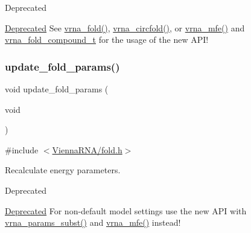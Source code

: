 \begin{DoxyRefDesc}{Deprecated}
\item[\hyperlink{deprecated__deprecated000069}{Deprecated}]See \hyperlink{group__mfe__global_ga29a33b2895f4e67b0480271ff289afdc}{vrna\+\_\+fold()}, \hyperlink{group__mfe__global_gaf973483d8acbc8cc9aacfc8a9b7f0074}{vrna\+\_\+circfold()}, or \hyperlink{group__mfe__global_gabd3b147371ccf25c577f88bbbaf159fd}{vrna\+\_\+mfe()} and \hyperlink{group__fold__compound_ga1b0cef17fd40466cef5968eaeeff6166}{vrna\+\_\+fold\+\_\+compound\+\_\+t} for the usage of the new A\+P\+I!\end{DoxyRefDesc}
\mbox{\label{group__mfe__global__deprecated_ga41bf8f6fa15b94471f7095cad9f0ccf3}} 
\subsubsection{\texorpdfstring{update\+\_\+fold\+\_\+params()}{update\_fold\_params()}}
{\footnotesize\ttfamily void update\+\_\+fold\+\_\+params (\begin{DoxyParamCaption}\item[{void}]{ }\end{DoxyParamCaption})}



{\ttfamily \#include $<$\hyperlink{fold_8h}{Vienna\+R\+N\+A/fold.\+h}$>$}



Recalculate energy parameters. 

\begin{DoxyRefDesc}{Deprecated}
\item[\hyperlink{deprecated__deprecated000070}{Deprecated}]For non-\/default model settings use the new A\+PI with \hyperlink{group__energy__parameters_ga5d1909208f7ea3baa98b75afaa1f62ca}{vrna\+\_\+params\+\_\+subst()} and \hyperlink{group__mfe__global_gabd3b147371ccf25c577f88bbbaf159fd}{vrna\+\_\+mfe()} instead!\end{DoxyRefDesc}
\mbox{\label{group__mfe__global__deprecated_gae66dc422efb8f5d56717d92d6002a9f8}} 
